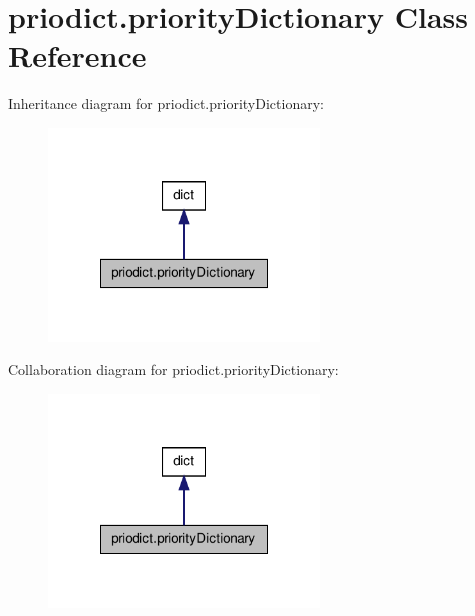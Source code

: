 \hypertarget{classpriodict_1_1priorityDictionary}{\section{priodict.\-priority\-Dictionary Class Reference}
\label{classpriodict_1_1priorityDictionary}
}


Inheritance diagram for priodict.\-priority\-Dictionary\-:\nopagebreak
\begin{figure}[H]
\begin{center}
\leavevmode
\includegraphics[width=204pt]{classpriodict_1_1priorityDictionary__inherit__graph}
\end{center}
\end{figure}


Collaboration diagram for priodict.\-priority\-Dictionary\-:\nopagebreak
\begin{figure}[H]
\begin{center}
\leavevmode
\includegraphics[width=204pt]{classpriodict_1_1priorityDictionary__coll__graph}
\end{center}
\end{figure}
